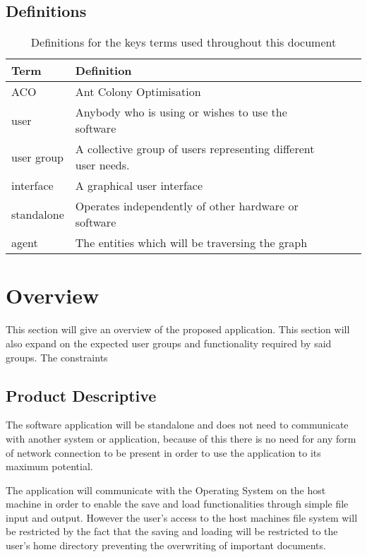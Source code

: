 \subsection{Definitions}

\begin{table}[h]
\centering
\begin{tabular}{|l|l|lll}
\textbf{Term} & \textbf{Definition}                                            \\ 
\hline
ACO           & Ant Colony Optimisation                              \\ 
user          & Anybody who is using or wishes to use the software      \\ 
user group    & A collective group of users representing different user needs. \\ 
interface       &A graphical user interface \\
standalone    &Operates independently of other hardware or software\\
agent		&The entities which will be traversing the graph \\
\end{tabular}
\caption{Definitions for the keys terms used throughout this document}
\end{table}

\section{Overview}

This section will give an overview of the proposed application. This section will also expand on the expected user groups and functionality required by said groups. The constraints 

\subsection{Product Descriptive}

The software application will be standalone and does not need to communicate with another system or application, because of this there is no need for any form of network connection to be present in order to use the application to its maximum potential.

The application will communicate with the Operating System on the host machine in order to enable the save and load functionalities through simple file input and output. However the user’s access to the host machines file system will be restricted by the fact that the saving and loading will be restricted to the user’s home directory preventing the overwriting of important documents.

